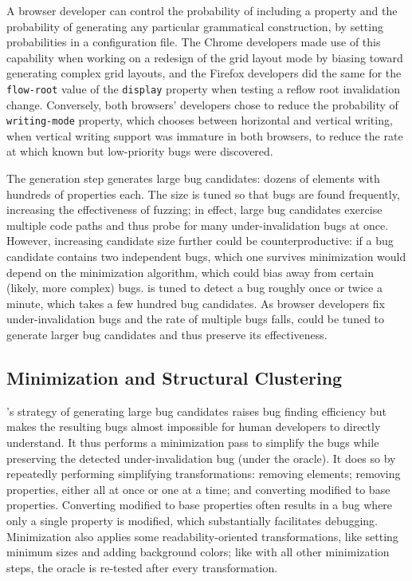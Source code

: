 A browser developer can control the probability of including a property
  and the probability of generating any particular grammatical construction,
  by setting probabilities in a configuration file.
The Chrome developers made use of this capability
  when working on a redesign of the grid layout mode
  by biasing \toolname toward generating complex grid layouts,
  and the Firefox developers did the same for
  the \texttt{flow-root} value of the \texttt{display} property
  when testing a reflow root invalidation change.
Conversely, both browsers' developers chose to
  reduce the probability of \texttt{writing-mode} property,
  which chooses between horizontal and vertical writing,
  when vertical writing support was immature in both browsers,
  to reduce the rate at which known but low-priority bugs
  were discovered.

The generation step generates large bug candidates:
  dozens of elements with hundreds of properties each.
The size is tuned so that bugs are found frequently,
  increasing the effectiveness of fuzzing;
  in effect, large bug candidates exercise multiple code paths
  and thus probe for many under-invalidation bugs at once.
However, increasing candidate size further could be counterproductive:
  if a bug candidate contains two independent bugs,
  which one survives minimization would depend on
  the minimization algorithm,
  which could bias \toolname away from certain
  (likely, more complex) bugs.
\toolname is tuned to detect a bug roughly once or twice a minute,
  which takes a few hundred bug candidates.
As browser developers fix under-invalidation bugs
  and the rate of multiple bugs falls,
  \toolname could be tuned to generate larger bug candidates
  and thus preserve its effectiveness.

\subsection{Minimization and Structural Clustering}

\toolname's strategy of generating large bug candidates
  raises bug finding efficiency
  but makes the resulting bugs almost impossible
  for human developers to directly understand.
It thus performs a minimization pass
  to simplify the bugs while preserving
  the detected under-invalidation bug (under the oracle).
It does so by repeatedly performing simplifying transformations:
  removing elements;
  removing properties, either all at once or one at a time;
  and converting modified to base properties.
Converting modified to base properties
  often results in a bug where only a single property is modified,
  which substantially facilitates debugging.
Minimization also applies some readability-oriented transformations,
  like setting minimum sizes and adding background colors;
  like with all other minimization steps,
  the oracle is re-tested after every transformation.

